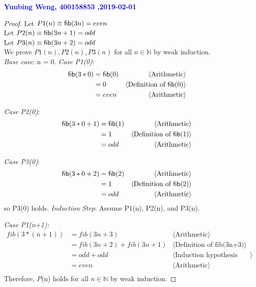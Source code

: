 \documentclass[11pt,fleqn]{article}
\newcommand{\mname}[1]{\mbox{\sf #1}}
\newcommand{\pnote}[1]{{\langle \text{#1} \rangle}}
\begin{document}
\begin{enumerate}
  \textcolor{blue}{\textbf{Yunbing Weng, 400158853 ,2019-02-01}}

\begin{proof}
\medskip
Let $P1(n) \equiv \mname{fib}(3n) = even$\\
Let $P2(n) \equiv \mname{fib}(3n+1) = odd$\\
Let $P3(n) \equiv \mname{fib}(3n+2) = odd$\\

We prove $P1(n), P2(n), P3(n)$ for all $n \in \mathbb{N}$ by weak induction.\\

\emph{Base case}:  n = 0.
\bigbreak
\emph{Case P1(0)}:\\
\begin{align*}
\mname{fib}(3*0) &= \mname{fib}(0) &\pnote{Arithmetic}\\
&= 0 &\pnote{Definition of \mname{fib}(0)}\\
&= even &\pnote{Arithmetic}
\end{align*}

\emph{Case P2(0)}:\\
\begin{align*}
\mname{fib}(3*0 + 1) &= \mname{fib}(1) &\pnote{Arithmetic}\\
&= 1 &\pnote{Definition of \mname{fib}(1)}\\
&= odd &\pnote{Arithmetic}
\end{align*}

\emph{Case P3(0)}:\\
\begin{align*}
\mname{fib}(3*0 + 2) &= \mname{fib}(2) &\pnote{Arithmetic}\\
&= 1 &\pnote{Definition of \mname{fib}(2)}\\
&= odd &\pnote{Arithmetic}
\end{align*}
so P3(0) holds.
\medbreak
\emph{Induction Step}: Assume P1(n), P2(n), and P3(n).
\medbreak

\emph{Case P1(n+1):}\\
\begin{align*}
fib(3*(n+1)) &= fib(3n+3) &\pnote{Arithmetic}\\
&=fib(3n+2) + fib(3n+1) &\pnote{Definition of fib(3n+3)}\\
&=odd + odd &\pnote{Induction hypothesis P2(n), P3(n)}\\
&=even &\pnote{Arithmetic}\\
\end{align*}
Therefore, \emph{P}(n) holds for all $n \in \mathbb{N}$ by weak induction.
\bigbreak


\end{proof}
\end{enumerate}
\end{document}
